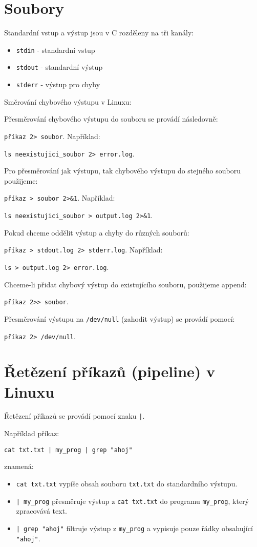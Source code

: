 \documentclass{article}
\begin{document}
\section{Soubory}

Standardní vstup a výstup jsou v C rozděleny na tři kanály:

\begin{itemize}
    \item \texttt{stdin} - standardní vstup
    \item \texttt{stdout} - standardní výstup
    \item \texttt{stderr} - výstup pro chyby
\end{itemize}

Směrování chybového výstupu v Linuxu:

Přesměrování chybového výstupu do souboru se provádí následovně:

\texttt{příkaz 2> soubor}. Například:

\texttt{ls neexistujici\_soubor 2> error.log}.

Pro přesměrování jak výstupu, tak chybového výstupu do stejného souboru použijeme:

\texttt{příkaz > soubor 2>\&1}. Například:

\texttt{ls neexistujici\_soubor > output.log 2>\&1}.

Pokud chceme oddělit výstup a chyby do různých souborů:

\texttt{příkaz > stdout.log 2> stderr.log}. Například:

\texttt{ls > output.log 2> error.log}.

Chceme-li přidat chybový výstup do existujícího souboru, použijeme append:

\texttt{příkaz 2>> soubor}.

Přesměrování výstupu na \texttt{/dev/null} (zahodit výstup) se provádí pomocí:

\texttt{příkaz 2> /dev/null}.

\section{Řetězení příkazů (pipeline) v Linuxu}

Řetězení příkazů se provádí pomocí znaku \texttt{|}.

Například příkaz:

\texttt{cat txt.txt | my\_prog | grep "ahoj"}

znamená:

\begin{itemize}
    \item \texttt{cat txt.txt} vypíše obsah souboru \texttt{txt.txt} do standardního výstupu.
    \item \texttt{| my\_prog} přesměruje výstup z \texttt{cat txt.txt} do programu \texttt{my\_prog}, který zpracovává text.
    \item \texttt{| grep "ahoj"} filtruje výstup z \texttt{my\_prog} a vypisuje pouze řádky obsahující \texttt{"ahoj"}.
\end{itemize}
\end{document}
